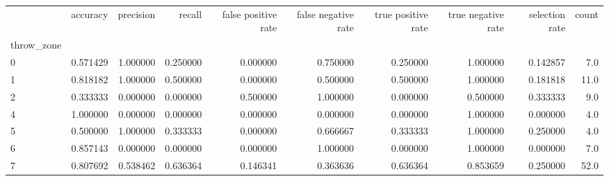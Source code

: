 \begin{tabular}{lrrrrrrrrr}
\toprule
{} &  accuracy &  precision &    recall &  false positive rate &  false negative rate &  true positive rate &  true negative rate &  selection rate &  count \\
throw\_zone &           &            &           &                      &                      &                     &                     &                 &        \\
\midrule
0          &  0.571429 &   1.000000 &  0.250000 &             0.000000 &             0.750000 &            0.250000 &            1.000000 &        0.142857 &    7.0 \\
1          &  0.818182 &   1.000000 &  0.500000 &             0.000000 &             0.500000 &            0.500000 &            1.000000 &        0.181818 &   11.0 \\
2          &  0.333333 &   0.000000 &  0.000000 &             0.500000 &             1.000000 &            0.000000 &            0.500000 &        0.333333 &    9.0 \\
4          &  1.000000 &   0.000000 &  0.000000 &             0.000000 &             0.000000 &            0.000000 &            1.000000 &        0.000000 &    4.0 \\
5          &  0.500000 &   1.000000 &  0.333333 &             0.000000 &             0.666667 &            0.333333 &            1.000000 &        0.250000 &    4.0 \\
6          &  0.857143 &   0.000000 &  0.000000 &             0.000000 &             1.000000 &            0.000000 &            1.000000 &        0.000000 &    7.0 \\
7          &  0.807692 &   0.538462 &  0.636364 &             0.146341 &             0.363636 &            0.636364 &            0.853659 &        0.250000 &   52.0 \\
\bottomrule
\end{tabular}
